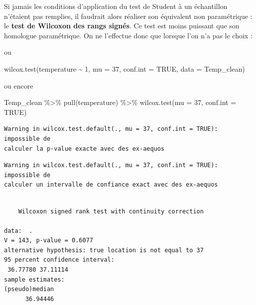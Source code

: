 \documentclass[
  a4paper,
  DIV=11,
  numbers=noendperiod,
  oneside]{scrreprt}
\newenvironment{Shaded}{}{}
\newcommand{\AttributeTok}[1]{\textcolor[rgb]{0.84,0.23,0.29}{#1}}
\newcommand{\ConstantTok}[1]{\textcolor[rgb]{0.00,0.36,0.77}{#1}}
\newcommand{\DecValTok}[1]{\textcolor[rgb]{0.00,0.36,0.77}{#1}}
\newcommand{\FunctionTok}[1]{\textcolor[rgb]{0.44,0.26,0.76}{#1}}
\newcommand{\NormalTok}[1]{\textcolor[rgb]{0.14,0.16,0.18}{#1}}
\newcommand{\SpecialCharTok}[1]{\textcolor[rgb]{0.00,0.36,0.77}{#1}}
\begin{document}
Si jamais les conditions d'application du test de Student à un
échantillon n'étaient pas remplies, il faudrait alors réaliser son
équivalent non paramétrique : le \textbf{test de Wilcoxon des rangs
signés}. Ce test est moins puissant que son homologue paramétrique. On
ne l'effectue donc que lorsque l'on n'a pas le choix :

\begin{Shaded}
\end{Shaded}

ou

\begin{Shaded}
\begin{Highlighting}[]
\FunctionTok{wilcox.test}\NormalTok{(temperature }\SpecialCharTok{\textasciitilde{}} \DecValTok{1}\NormalTok{, }\AttributeTok{mu =} \DecValTok{37}\NormalTok{, }\AttributeTok{conf.int =} \ConstantTok{TRUE}\NormalTok{, }\AttributeTok{data =}\NormalTok{ Temp\_clean)}
\end{Highlighting}
\end{Shaded}

ou encore

\begin{Shaded}
\begin{Highlighting}[]
\NormalTok{Temp\_clean }\SpecialCharTok{\%\textgreater{}\%}
  \FunctionTok{pull}\NormalTok{(temperature) }\SpecialCharTok{\%\textgreater{}\%}
  \FunctionTok{wilcox.test}\NormalTok{(}\AttributeTok{mu =} \DecValTok{37}\NormalTok{, }\AttributeTok{conf.int =} \ConstantTok{TRUE}\NormalTok{)}
\end{Highlighting}
\end{Shaded}

\begin{verbatim}
Warning in wilcox.test.default(., mu = 37, conf.int = TRUE): impossible de
calculer la p-value exacte avec des ex-aequos
\end{verbatim}

\begin{verbatim}
Warning in wilcox.test.default(., mu = 37, conf.int = TRUE): impossible de
calculer un intervalle de confiance exact avec des ex-aequos
\end{verbatim}

\begin{verbatim}

    Wilcoxon signed rank test with continuity correction

data:  .
V = 143, p-value = 0.6077
alternative hypothesis: true location is not equal to 37
95 percent confidence interval:
 36.77780 37.11114
sample estimates:
(pseudo)median 
      36.94446 
\end{verbatim}
\end{document}
